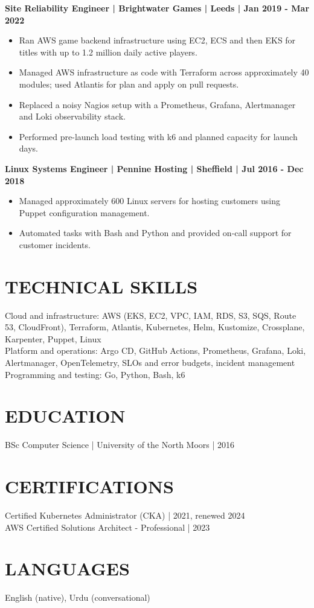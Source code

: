 \documentclass[11pt,a4paper]{article}
\begin{document}
\textbf{Site Reliability Engineer | Brightwater Games | Leeds | Jan 2019 - Mar 2022}
\begin{itemize}
\item Ran AWS game backend infrastructure using EC2, ECS and then EKS for titles with up to 1.2 million daily active players.
\item Managed AWS infrastructure as code with Terraform across approximately 40 modules; used Atlantis for plan and apply on pull requests.
\item Replaced a noisy Nagios setup with a Prometheus, Grafana, Alertmanager and Loki observability stack.
\item Performed pre-launch load testing with k6 and planned capacity for launch days.
\end{itemize}

\textbf{Linux Systems Engineer | Pennine Hosting | Sheffield | Jul 2016 - Dec 2018}
\begin{itemize}
\item Managed approximately 600 Linux servers for hosting customers using Puppet configuration management.
\item Automated tasks with Bash and Python and provided on-call support for customer incidents.
\end{itemize}

\section*{TECHNICAL SKILLS}
Cloud and infrastructure: AWS (EKS, EC2, VPC, IAM, RDS, S3, SQS, Route 53, CloudFront), Terraform, Atlantis, Kubernetes, Helm, Kustomize, Crossplane, Karpenter, Puppet, Linux\\
Platform and operations: Argo CD, GitHub Actions, Prometheus, Grafana, Loki, Alertmanager, OpenTelemetry, SLOs and error budgets, incident management\\
Programming and testing: Go, Python, Bash, k6

\section*{EDUCATION}
BSc Computer Science | University of the North Moors | 2016

\section*{CERTIFICATIONS}
Certified Kubernetes Administrator (CKA) | 2021, renewed 2024\\
AWS Certified Solutions Architect - Professional | 2023

\section*{LANGUAGES}
English (native), Urdu (conversational)
\end{document}

